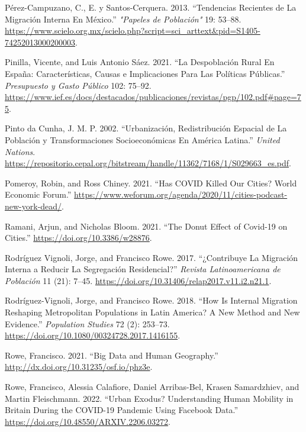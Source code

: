\documentclass[11pt,letterpaper]{article}
\newlength{\cslhangindent}
\newlength{\cslentryspacingunit} %
\newenvironment{CSLReferences}[2] %
 {%
  \setlength{\parindent}{0pt}
  \ifodd #1
  \let\oldpar\par
  \def\par{\hangindent=\cslhangindent\oldpar}
  \fi
  \setlength{\parskip}{#2\cslentryspacingunit}
 }%
 {}
\begin{document}
\begin{CSLReferences}{1}{0}
\leavevmode{}%
Pérez-Campuzano, C., E. y Santos-Cerquera. 2013. {``Tendencias Recientes
de La Migración Interna En México.''} \emph{"Papeles de Población"} 19:
53--88.
\url{https://www.scielo.org.mx/scielo.php?script=sci_arttext\&pid=S1405-74252013000200003}.

\leavevmode{}%
Pinilla, Vicente, and Luis Antonio Sáez. 2021. {``La Despoblación Rural
En España: Características, Causas e Implicaciones Para Las Políticas
Públicas.''} \emph{Presupuesto y Gasto Público} 102: 75--92.
\url{https://www.ief.es/docs/destacados/publicaciones/revistas/pgp/102.pdf\#page=75}.

\leavevmode{}%
Pinto da Cunha, J. M. P. 2002. {``Urbanización, Redistribución Espacial
de La Población y Transformaciones Socioeconómicas En América Latina.''}
\emph{United Nations}.
\url{https://repositorio.cepal.org/bitstream/handle/11362/7168/1/S029663_es.pdf}.

\leavevmode{}%
Pomeroy, Robin, and Ross Chiney. 2021. {``Has COVID Killed Our Cities?
World Economic Forum.''}
\url{https://www.weforum.org/agenda/2020/11/cities-podcast-new-york-dead/}.

\leavevmode{}%
Ramani, Arjun, and Nicholas Bloom. 2021. {``The Donut Effect of Covid-19
on Cities.''} \url{https://doi.org/10.3386/w28876}.

\leavevmode{}%
Rodríguez Vignoli, Jorge, and Francisco Rowe. 2017. {``¿Contribuye La
Migración Interna a Reducir La Segregación Residencial?''} \emph{Revista
Latinoamericana de Población} 11 (21): 7--45.
\url{https://doi.org/10.31406/relap2017.v11.i2.n21.1}.

\leavevmode{}%
Rodríguez-Vignoli, Jorge, and Francisco Rowe. 2018. {``How Is Internal
Migration Reshaping Metropolitan Populations in Latin America? A New
Method and New Evidence.''} \emph{Population Studies} 72 (2): 253--73.
\url{https://doi.org/10.1080/00324728.2017.1416155}.

\leavevmode{}%
Rowe, Francisco. 2021. {``Big Data and Human Geography.''}
\url{http://dx.doi.org/10.31235/osf.io/phz3e}.

\leavevmode{}%
Rowe, Francisco, Alessia Calafiore, Daniel Arribas-Bel, Krasen
Samardzhiev, and Martin Fleischmann. 2022. {``Urban Exodus?
Understanding Human Mobility in Britain During the COVID-19 Pandemic
Using Facebook Data.''} \url{https://doi.org/10.48550/ARXIV.2206.03272}.


\end{CSLReferences}
\end{document}
